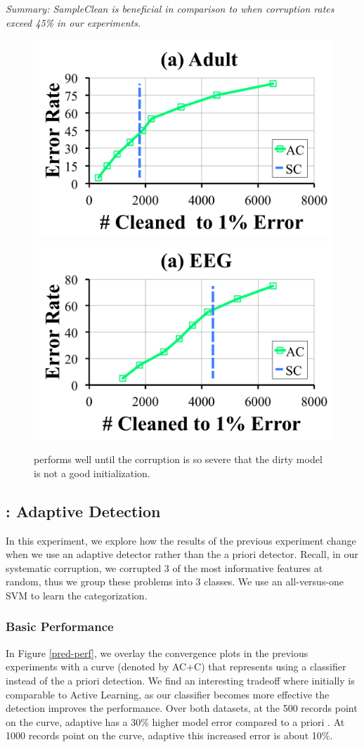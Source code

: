 \vspace{0.25em}

\noindent \emph{Summary: SampleClean is beneficial in comparison to \sys when corruption rates exceed 45\% in our experiments.}

\begin{figure}[ht!]
\centering\vspace{-2em}
 \includegraphics[width=0.49\columnwidth]{exp/exp9a.pdf}
  \includegraphics[width=0.49\columnwidth]{exp/exp9b.pdf}
 \caption{\sys performs well until the corruption is so severe that the dirty model is not a good initialization.  \label{bias}}
\end{figure}

\subsection{\sys: Adaptive Detection}
In this experiment, we explore how the results of the previous experiment change when we use an adaptive detector rather than the a priori detector.
Recall, in our systematic corruption, we corrupted 3 of the most informative features at random, thus we group these problems into 3 classes.
We use an all-versus-one SVM to learn the categorization.

\subsubsection{Basic Performance}
In Figure \ref{pred-perf}, we overlay the convergence plots in the previous experiments with a curve (denoted by AC+C) that represents \sys using a classifier instead of the a priori detection.
We find an interesting tradeoff where initially \sys is comparable to Active Learning, as our classifier becomes more effective the detection improves the performance.
Over both datasets, at the 500 records point on the curve, adaptive \sys has a 30\% higher model error compared to a priori \sys.
At 1000 records point on the curve, adaptive \sys this increased error is about 10\%.

